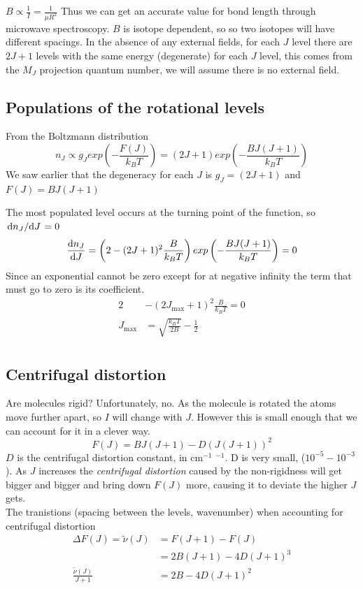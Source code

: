 \documentclass{article}
\newcommand{\cm}{cm\(^{-1}\) }
\begin{document}
    $B \propto \frac{1}{I} = \frac{1}{\mu R^2}$ Thus we can get an accurate value for bond length through 
    microwave spectroscopy. $B$ is isotope dependent, so so two isotopes will have different spacings.
    In the absence of any external fields, for each $J$ level there are $2J+1$ levels with the same energy (degenerate)
    for each $J$ level, this comes from the $M_J$ projection quantum number, we will assume there is no external
    field.

    \subsection{Populations of the rotational levels}
    From the Boltzmann distribution $$n_J \propto g_J exp\left(-\frac{F(J)}{k_BT}\right) = (2J+1)exp\left(-\frac{BJ(J+1)}{k_BT}\right)$$
    We saw earlier that the degeneracy for each $J$ is $g_J = (2J +1)$ and $F(J) = BJ(J+1)$

    The most populated level occurs at the turning point of the function, so $\dv*{n_J}{J}=0$
    $$\dv{n_J}{J} = \left(2 -(2J+1)^2\frac{B}{k_BT}\right)exp\left(-\frac{BJ(J+1)}{k_BT}\right) = 0$$
    Since an exponential cannot be zero except for at negative infinity the term that must go to zero is its
    coefficient.
    \begin{align*}
        2 &- (2J_{\text{max}} + 1)^2\frac{B}{k_BT} = 0\\
        J_\text{max} &= \sqrt{\frac{k_BT}{2B}} - \frac{1}{2}\\
    \end{align*}

    \subsection{Centrifugal distortion}
    Are molecules rigid? Unfortunately, no. As the molecule is rotated the atoms move further apart, so $I$ will
    change with $J$. However this is small enough that we can account for it in a clever way.
    $$ F(J) = BJ(J+1) - D(J(J+1))^2$$
    $D$ is the centrifugal distortion constant, in \cm $^{-1}$. D is very small, ($10^{-5} - 10^{-3}$).
    As $J$ increases the \emph{centrifugal distortion} caused by the non-rigidness will get bigger and bigger and bring 
    down $F(J)$ more, causing it to deviate the higher $J$ gets.\\

    The tranistions (spacing between the levels, wavenumber) when accounting for centrifugal distortion
    \begin{align*}
        \Delta F(J) = \tilde{\nu}(J) &= F(J+1) - F(J) \\
        &= 2B(J+1) - 4D(J+1)^3\\
        \frac{\tilde{\nu}(J)}{J+1} &= 2B-4D(J+1)^2
    \end{align*}
\end{document}
